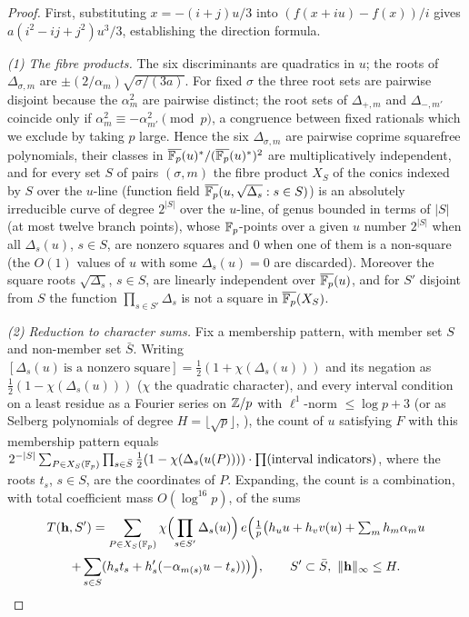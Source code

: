 \begin{proof}
First, substituting $x=-(i+j)u/3$ into $(f(x+iu)-f(x))/i$ gives $a(i^2-ij+j^2)u^3/3$, establishing the direction formula.\par
\emph{(1) The fibre products.}  The six discriminants are quadratics in $u$; the roots of $\Delta_{\sigma,m}$ are $\pm(2/\alpha_m)\sqrt{\sigma/(3a)}$.
For fixed $\sigma$ the
three root sets are pairwise disjoint because the $\alpha_m^2$ are pairwise distinct; the root sets of $\Delta_{+,m}$ and $\Delta_{-,m'}$ coincide only if
$\alpha_m^2\equiv-\alpha_{m'}^2\pmod p$, a congruence between fixed rationals which we exclude by taking $p$ large.  Hence the six $\Delta_{\sigma,m}$ are
pairwise coprime squarefree polynomials, their classes in $\overline{\mathbb{F}_p}(u)^*/(\overline{\mathbb{F}_p}(u)^*)^2$ are multiplicatively independent, and for every set
$S$ of pairs $(\sigma,m)$ the fibre product $X_S$ of the conics indexed by $S$ over the $u$-line (function field $\overline{\mathbb{F}_p}(u,\sqrt{\Delta_s}:s\in S)$)
is an absolutely irreducible curve of degree $2^{|S|}$ over the $u$-line, of genus bounded in terms of $|S|$ (at most twelve branch points), whose
$\mathbb{F}_p$-points over a given $u$ number $2^{|S|}$ when all $\Delta_s(u)$, $s\in S$, are nonzero squares and $0$ when one of them is a non-square (the $O(1)$
values of $u$ with some $\Delta_s(u)=0$ are discarded).  Moreover the square roots $\sqrt{\Delta_s}$, $s\in S$, are linearly independent over
$\overline{\mathbb{F}_p}(u)$, and for $S'$ disjoint from $S$ the function $\prod_{s\in S'}\Delta_s$ is not a square in $\overline{\mathbb{F}_p}(X_S)$.

\emph{(2) Reduction to character sums.}  Fix a membership pattern, with member set $S$ and non-member set $\bar S$.  Writing
$[\Delta_s(u)\ \text{is a nonzero square}]=\tfrac12(1+\chi(\Delta_s(u)))$ and its negation as $\tfrac12(1-\chi(\Delta_s(u)))$ ($\chi$ the quadratic
character), and every interval condition on a least residue as a Fourier series on $\mathbb{Z}/p$ with $\ell^1$-norm $\le\log p+3$ (or as Selberg polynomials of
degree $H=\lfloor\sqrt p\rfloor$, \cite{Montgomery,Vaaler}), the count of $u$ satisfying $F$ with this membership pattern equals
$2^{-|S|}\sum_{P\in X_S(\mathbb{F}_p)}\prod_{s\in\bar S}\tfrac12(1-\chi(\Delta_s(u(P))))\cdot\prod(\text{interval indicators})$, where the roots $t_s$, $s\in S$, are the
coordinates of $P$.  Expanding, the count is a combination, with total coefficient mass $O(\log^{16}p)$, of the sums
\begin{multline*}
 T(\mathbf h,S')=\sum_{P\in X_S(\mathbb{F}_p)}\chi\Bigl(\prod_{s\in S'}\Delta_s(u)\Bigr)\,
 e\Bigl(\tfrac1p\bigl(h_uu+h_vv(u)+\textstyle\sum_mh_m\alpha_mu\\
 +\sum_{s\in S}(h_st_s+h'_s(-\alpha_{m(s)}u-t_s))\bigr)\Bigr),
 \qquad S'\subset\bar S,\ \|\mathbf h\|_\infty\le H .
\end{multline*}


\end{proof}
